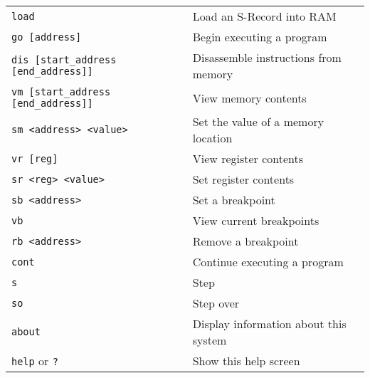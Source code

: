 

\newcommand{\witem}[2]
{\item[\src{#1}] #2}
\begin{comment}
 load                               Load an S-Record into RAM
 go [address]                       Begin executing a program
 dis [start_address [end_address]]  Disassemble instructions from memory
 vm [start_address [end_address]]   View memory contents
 sm <address> <value>               Set the value of a memory location
 vr [reg]                           View register contents
 sr <reg> <value>                   Set register contents
 sb <address>                       Set a breakpoint
 vb                                 View current breakpoints
 rb <address>                       Remove a breakpoint
 cont                               Continue executing a program
 s                                  Step
 so                                 Step over
 about                              Display information about this system
 help or ?                          Display this information
\end{comment}

\begin{tabular}{l l}
\verb|load|
&
Load an S-Record into RAM
\\

\verb|go [address]|
&
Begin executing a program
\\

\verb|dis [start_address [end_address]]|
&
Disassemble instructions from memory
\\

\verb|vm [start_address [end_address]]|
&
View memory contents
\\

\verb|sm <address> <value>|
&
Set the value of a memory location
\\

\verb|vr [reg] |
&
View register contents
\\

\verb|sr <reg> <value>|
&
Set register contents
\\

\verb|sb <address>|
&
Set a breakpoint
\\

\verb|vb|
&
View current breakpoints
\\

\verb|rb <address>|
&
Remove a breakpoint
\\

\verb|cont|
&
Continue executing a program
\\

\verb|s|
&
Step
\\

\verb|so|
&
Step over
\\

\verb|about|
&
Display information about this system
\\

\verb|help| or \verb|?|
&
Show this help screen
\\


\end{tabular}